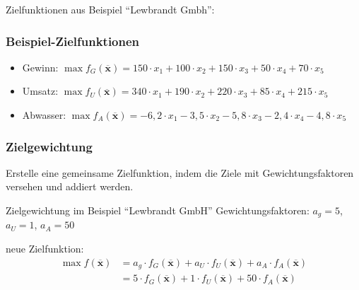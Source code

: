 \begin{frame}
 Zielfunktionen aus Beispiel "`Lewbrandt Gmbh"':
 \frametitle{Beispiel-Zielfunktionen}
 \begin{itemize}
  \item Gewinn: $\max f_G(\mathbf{\overline{x}}) = 150\cdot x_1 + 100\cdot x_2 + 150\cdot x_3 + 50\cdot x_4 + 70\cdot x_5$
  \item Umsatz: $\max f_U(\mathbf{\overline{x}}) = 340\cdot x_1 + 190\cdot x_2 + 220\cdot x_3 + 85\cdot x_4 + 215\cdot x_5$
  \item Abwasser: $\max f_A(\mathbf{\overline{x}}) = -6,2\cdot x_1 - 3,5\cdot x_2 - 5,8\cdot x_3 - 2,4\cdot x_4 - 4,8\cdot x_5$
 \end{itemize}
\end{frame}

\begin{frame}
 \frametitle{Zielgewichtung}
 Erstelle \alert{eine} gemeinsame Zielfunktion, indem die Ziele mit Gewichtungsfaktoren versehen und addiert werden.
 
 \begin{block}{Zielgewichtung im Beispiel "`Lewbrandt GmbH"'}
  Gewichtungsfaktoren: $a_g=5$, $a_U=1$, $a_A=50$\par
  neue Zielfunktion: 
  \[
  \begin{split}
  \max f(\mathbf{\overline{x}}) &= a_g\cdot f_G(\mathbf{\overline{x}}) + a_U\cdot f_U(\mathbf{\overline{x}})+a_A\cdot f_A(\mathbf{\overline{x}})\\
  &=5\cdot f_G(\mathbf{\overline{x}}) + 1\cdot f_U(\mathbf{\overline{x}})+50\cdot f_A(\mathbf{\overline{x}})
  \end{split}
  \]
 \end{block}
\end{frame}

